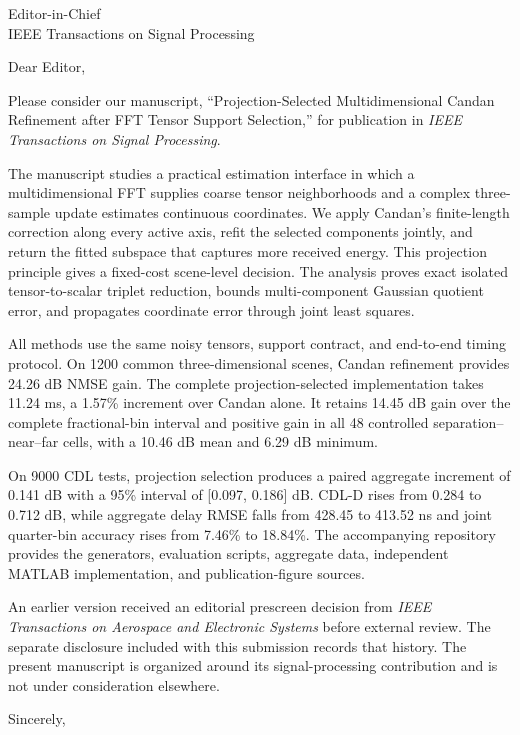 \documentclass[11pt]{letter}
\begin{document}
\begin{letter}{Editor-in-Chief\\IEEE Transactions on Signal Processing}
\opening{Dear Editor,}

Please consider our manuscript, ``Projection-Selected Multidimensional Candan Refinement after FFT Tensor Support Selection,'' for publication in \emph{IEEE Transactions on Signal Processing}.

The manuscript studies a practical estimation interface in which a multidimensional FFT supplies coarse tensor neighborhoods and a complex three-sample update estimates continuous coordinates. We apply Candan's finite-length correction along every active axis, refit the selected components jointly, and return the fitted subspace that captures more received energy. This projection principle gives a fixed-cost scene-level decision. The analysis proves exact isolated tensor-to-scalar triplet reduction, bounds multi-component Gaussian quotient error, and propagates coordinate error through joint least squares.

All methods use the same noisy tensors, support contract, and end-to-end timing protocol. On 1200 common three-dimensional scenes, Candan refinement provides 24.26 dB NMSE gain. The complete projection-selected implementation takes 11.24 ms, a 1.57\% increment over Candan alone. It retains 14.45 dB gain over the complete fractional-bin interval and positive gain in all 48 controlled separation--near--far cells, with a 10.46 dB mean and 6.29 dB minimum.

On 9000 CDL tests, projection selection produces a paired aggregate increment of 0.141 dB with a 95\% interval of [0.097, 0.186] dB. CDL-D rises from 0.284 to 0.712 dB, while aggregate delay RMSE falls from 428.45 to 413.52 ns and joint quarter-bin accuracy rises from 7.46\% to 18.84\%. The accompanying repository provides the generators, evaluation scripts, aggregate data, independent MATLAB implementation, and publication-figure sources.

An earlier version received an editorial prescreen decision from \emph{IEEE Transactions on Aerospace and Electronic Systems} before external review. The separate disclosure included with this submission records that history. The present manuscript is organized around its signal-processing contribution and is not under consideration elsewhere.

\closing{Sincerely,}
\end{letter}
\end{document}
